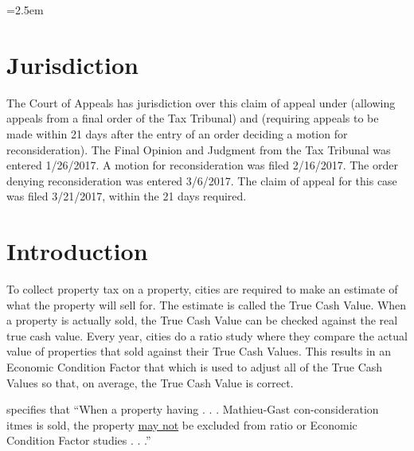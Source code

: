 \documentclass[12pt,\documentclassflag]{michiganCourtOfAppealsBrief}
\begin{document}
\tableofcontents

\newpage
\tableofauthorities

\pagestyle{plain}



\parindent=2.5em 
\doublespacing
\linenumbers

\section{Jurisdiction}

The Court of Appeals has jurisdiction over this claim of appeal under  (allowing appeals from a final order of the Tax Tribunal) and  (requiring appeals to be made within 21 days after the entry of an order deciding a motion for reconsideration). The Final Opinion and Judgment from the Tax Tribunal was entered 1/26/2017. A motion for reconsideration was filed 2/16/2017. The order denying reconsideration was entered 3/6/2017. The claim of appeal for this case was filed 3/21/2017, within the 21 days required.

\section{Introduction}

To collect property tax on a property, cities are required to make an estimate of what the property will sell for. The estimate is called the True Cash Value. When a property is actually sold, the True Cash Value can be checked against the real true cash value. Every year, cities do a ratio study where they compare the actual value of properties that sold against their True Cash Values. This results in an Economic Condition Factor that which is used to adjust all of the True Cash Values so that, on average, the True Cash Value is correct.

 specifies that ``When a property having . . . Mathieu-Gast con-consideration itmes is sold, the property \underline{may not} be excluded from ratio or Economic Condition Factor studies . . .''
\end{document}
